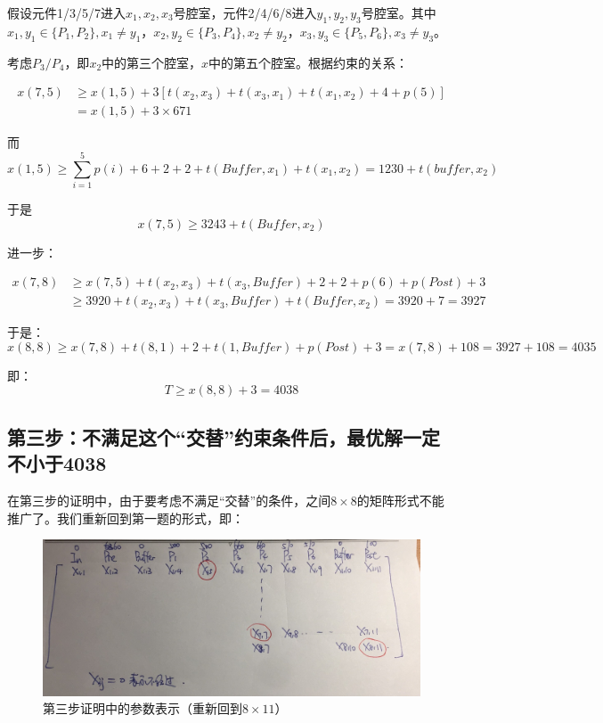 \documentclass{ctexart}
\begin{document}
{{        假设元件1/3/5/7进入$x_1,x_2,x_3$号腔室，元件2/4/6/8进入$y_1,y_2,y_3$号腔室。其中$x_1,y_1 \in \{P_1,P_2\},x_1 \neq y_1$，$x_2,y_2 \in \{P_3,P_4\},x_2 \neq y_2$，$x_3,y_3 \in \{P_5,P_6\},x_3 \neq y_3$。
        
        考虑$P_3/P_4$，即$x_2$中的第三个腔室，$x$中的第五个腔室。根据约束的关系：
		
		$$
		\begin{aligned}
		x(7,5) &\ge x(1,5)+3[t(x_2,x_3)+t(x_3,x_1)+t(x_1,x_2)+4+p(5)] \\
		&=x(1,5)+3 \times 671
		\end{aligned}
		$$
		
		而$$
		x(1,5) \ge \sum_{i=1}^5 p(i)+6+2+2+t(Buffer,x_1)+t(x_1,x_2)=1230+t(buffer,x_2)
		$$
		
		于是$$
		x(7,5) \ge 3243+t(Buffer,x_2) 
		$$
		
		进一步：
		
		$$
		\begin{aligned}
		x(7,8) &\ge x(7,5)+t(x_2,x_3)+t(x_3,Buffer)+2+2+p(6)+p(Post)+3 \\
		&\ge 3920+t(x_2,x_3)+t(x_3,Buffer)+t(Buffer,x_2)=3920+7=3927
		\end{aligned}
		$$
		
		于是：
		$$
		x(8,8) \ge x(7,8)+t(8,1)+2+t(1,Buffer)+p(Post)+3=x(7,8)+108=3927+108=4035
		$$
		
		即：
		$$
		T \ge x(8,8)+3 = 4038
		$$
		

		
    }

    \subsection{第三步：不满足这个“交替”约束条件后，最优解一定不小于4038}
    {
    	在第三步的证明中，由于要考虑不满足“交替”的条件，之间$8 \times 8$的矩阵形式不能推广了。我们重新回到第一题的形式，即：
    	
    	\begin{figure}[H]
    		\centering
    		\includegraphics[width = 0.9\linewidth]{proof3.jpg}
    		\caption{第三步证明中的参数表示（重新回到$8 \times 11$）}
    	\end{figure}
    	
}}
\end{document}
